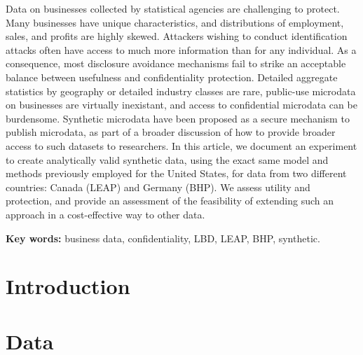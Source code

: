 \documentclass[10pt,twoside]{article}
\begin{document}
\begin{addmargin}[6mm]{6mm}
\begin{small}
\begin{singlespace}

Data on businesses collected by statistical agencies are challenging to protect. Many businesses have unique characteristics, and distributions of employment, sales, and profits are highly skewed. Attackers wishing to conduct identification attacks often have access to much more information than for any individual. As a consequence, most disclosure avoidance mechanisms  fail to strike an acceptable balance between usefulness and confidentiality protection. Detailed aggregate statistics by geography or detailed industry classes  are rare, public-use microdata on businesses are virtually inexistant, and access to confidential microdata can be burdensome. 
Synthetic microdata have been proposed as a secure mechanism to publish microdata, as part of a broader discussion of how  to provide broader access to such datasets to researchers.
In this article, we document an experiment to create analytically valid synthetic data, using the exact same model and methods previously employed for the United States, for data from two different countries: Canada (\ac{LEAP}) and Germany (\ac{BHP}). We assess utility and protection, and provide an assessment of the feasibility of extending such an approach in a cost-effective way to other data.

\smallskip \noindent \textbf{Key words:} business data, confidentiality, LBD, LEAP, BHP, synthetic.

\end{singlespace}
\end{small}
\end{addmargin}

\smallskip

\section{Introduction}


\section{Data} 
\label{sec:data}


%
\end{document}
